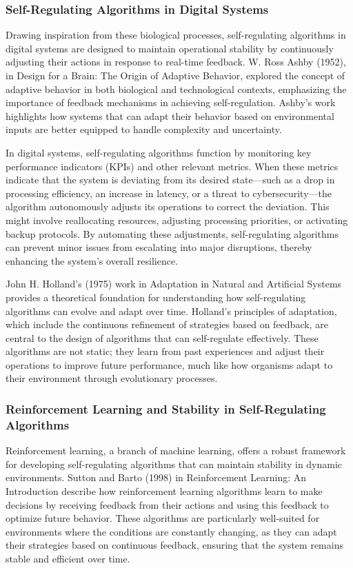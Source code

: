 \documentclass[12pt,twoside]{article}
\begin{document}
\subsubsection{Self-Regulating Algorithms in Digital Systems}

Drawing inspiration from these biological processes, self-regulating algorithms in digital systems are designed to maintain operational stability by continuously adjusting their actions in response to real-time feedback. W. Ross Ashby (1952), in Design for a Brain: The Origin of Adaptive Behavior, explored the concept of adaptive behavior in both biological and technological contexts, emphasizing the importance of feedback mechanisms in achieving self-regulation. Ashby’s work highlights how systems that can adapt their behavior based on environmental inputs are better equipped to handle complexity and uncertainty.

In digital systems, self-regulating algorithms function by monitoring key performance indicators (KPIs) and other relevant metrics. When these metrics indicate that the system is deviating from its desired state—such as a drop in processing efficiency, an increase in latency, or a threat to cybersecurity—the algorithm autonomously adjusts its operations to correct the deviation. This might involve reallocating resources, adjusting processing priorities, or activating backup protocols. By automating these adjustments, self-regulating algorithms can prevent minor issues from escalating into major disruptions, thereby enhancing the system's overall resilience.

John H. Holland’s (1975) work in Adaptation in Natural and Artificial Systems provides a theoretical foundation for understanding how self-regulating algorithms can evolve and adapt over time. Holland’s principles of adaptation, which include the continuous refinement of strategies based on feedback, are central to the design of algorithms that can self-regulate effectively. These algorithms are not static; they learn from past experiences and adjust their operations to improve future performance, much like how organisms adapt to their environment through evolutionary processes.

\subsubsection{Reinforcement Learning and Stability in Self-Regulating Algorithms}

Reinforcement learning, a branch of machine learning, offers a robust framework for developing self-regulating algorithms that can maintain stability in dynamic environments. Sutton and Barto (1998) in Reinforcement Learning: An Introduction describe how reinforcement learning algorithms learn to make decisions by receiving feedback from their actions and using this feedback to optimize future behavior. These algorithms are particularly well-suited for environments where the conditions are constantly changing, as they can adapt their strategies based on continuous feedback, ensuring that the system remains stable and efficient over time.
\end{document}
